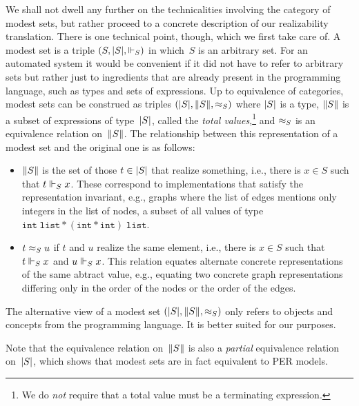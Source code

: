We shall not dwell any further on the technicalities involving the
category of modest sets, but rather proceed to a concrete description
of our realizability translation. There is one technical point,
though, which we first take care of. A modest set is a triple $(S,
|S|, {\Vdash_S})$ in which~$S$ is an arbitrary set. For an automated
system it would be convenient if it did not have to refer to arbitrary
sets but rather just to ingredients that are already present in the
programming language, such as types and sets of expressions. Up to
equivalence of categories, modest sets can be construed as triples
$(|S|, \|S\|, {\approx_{S}})$ where $|S|$ is a type, $\|S\|$ is
a subset of expressions of type~$|S|$, called the \emph{total
  values},\footnote{We do \emph{not} require that a total value must
  be a terminating expression.} and $\approx_{S}$ is an equivalence
relation on~$\|S\|$. The relationship between this representation of
a modest set and the original one is as follows:
%
\begin{itemize}
\item $\|S\|$ is the set of those $t \in |S|$ that
  realize something, i.e., there is $x \in S$ such that $t \Vdash_S x$.
  These correspond to implementations that satisfy
  the representation invariant, e.g., graphs where the list of edges
  mentions only integers in the list of nodes, a subset of
  all values of type $\mathtt{int} \; \mathtt{list} * (\mathtt{int} *
\mathtt{int}) \; \mathtt{list}$.
\item $t \approx_{S} u$ if $t$ and $u$ realize the same element, i.e.,
  there is $x \in S$ such that $t \Vdash_S x$ and $u \Vdash_S x$.
  This relation equates alternate concrete representations of the same
  abtract value, e.g., equating two concrete graph representations differing
  only in the order of the nodes or the order of the edges.
\end{itemize}
%
The alternative view of a modest set $(|S|, \|S\|, {\approx_{S}})$
only refers to objects and concepts from the programming language. It
is better suited for our purposes.

Note that the equivalence relation on~$\|S\|$ is also a
\emph{partial} equivalence relation on~$|S|$, which shows that
modest sets are in fact equivalent to PER models.


